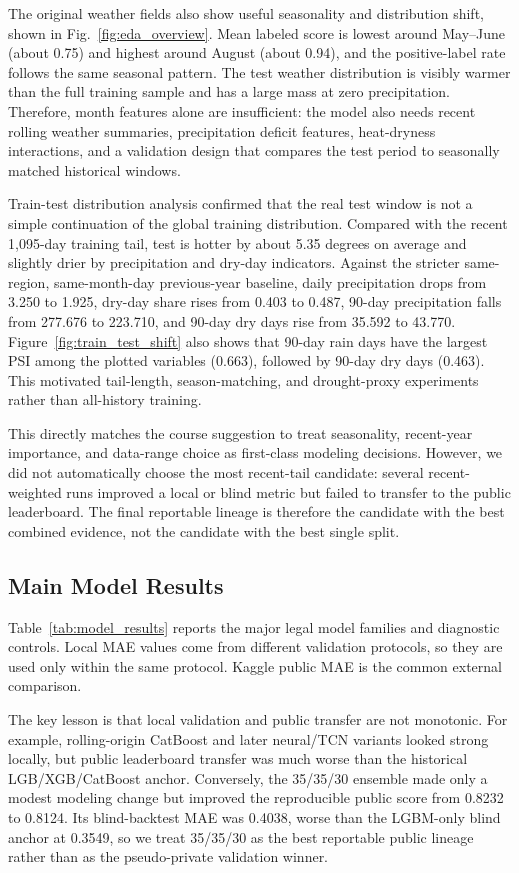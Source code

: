 \documentclass[conference]{IEEEtran}
\begin{document}
The original weather fields also show useful seasonality and distribution
shift, shown in Fig.~\ref{fig:eda_overview}. Mean labeled score is lowest around
May--June (about 0.75) and highest around August (about 0.94), and the
positive-label rate follows the same seasonal pattern. The test weather
distribution is visibly warmer than the full training sample and has a large
mass at zero precipitation. Therefore, month features alone are insufficient:
the model also needs recent rolling weather summaries, precipitation deficit
features, heat-dryness interactions, and a validation design that compares the
test period to seasonally matched historical windows.

Train-test distribution analysis confirmed that the real test window is not a
simple continuation of the global training distribution. Compared with the
recent 1,095-day training tail, test is hotter by about 5.35 degrees on average
and slightly drier by precipitation and dry-day indicators. Against the stricter
same-region, same-month-day previous-year baseline, daily precipitation drops
from 3.250 to 1.925, dry-day share rises from 0.403 to 0.487, 90-day
precipitation falls from 277.676 to 223.710, and 90-day dry days rise from
35.592 to 43.770. Figure~\ref{fig:train_test_shift} also shows that 90-day rain
days have the largest PSI among the plotted variables (0.663), followed by
90-day dry days (0.463). This motivated tail-length, season-matching, and
drought-proxy experiments rather than all-history training.

This directly matches the course suggestion to treat seasonality, recent-year
importance, and data-range choice as first-class modeling decisions. However,
we did not automatically choose the most recent-tail candidate: several
recent-weighted runs improved a local or blind metric but failed to transfer to
the public leaderboard. The final reportable lineage is therefore the candidate
with the best combined evidence, not the candidate with the best single split.

\subsection{Main Model Results}
Table~\ref{tab:model_results} reports the major legal model families and
diagnostic controls. Local MAE values come from different validation protocols,
so they are used only within the same protocol. Kaggle public MAE is the common
external comparison.

The key lesson is that local validation and public transfer are not monotonic.
For example, rolling-origin CatBoost and later neural/TCN variants looked strong
locally, but public leaderboard transfer was much worse than the historical
LGB/XGB/CatBoost anchor. Conversely, the 35/35/30 ensemble made only a modest
modeling change but improved the reproducible public score from 0.8232 to
0.8124. Its blind-backtest MAE was 0.4038, worse than the LGBM-only blind
anchor at 0.3549, so we treat 35/35/30 as the best reportable public lineage
rather than as the pseudo-private validation winner.
\end{document}
